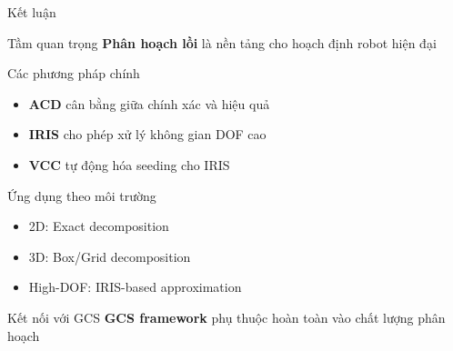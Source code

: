 \documentclass[aspectratio=169]{beamer}
\begin{document}
\begin{frame}{Kết luận}

    \begin{block}{Tầm quan trọng}
        \textbf{Phân hoạch lồi} là nền tảng cho hoạch định robot hiện đại
    \end{block}

    \begin{exampleblock}{Các phương pháp chính}
        \begin{itemize}
            \item \textbf{ACD} cân bằng giữa chính xác và hiệu quả
            \item \textbf{IRIS} cho phép xử lý không gian DOF cao
            \item \textbf{VCC} tự động hóa seeding cho IRIS
        \end{itemize}
    \end{exampleblock}

    \begin{alertblock}{Ứng dụng theo môi trường}
        \begin{itemize}
            \item 2D: Exact decomposition
            \item 3D: Box/Grid decomposition
            \item High-DOF: IRIS-based approximation
        \end{itemize}
    \end{alertblock}

    \begin{block}{Kết nối với GCS}
        \textbf{GCS framework} phụ thuộc hoàn toàn vào chất lượng phân hoạch
    \end{block}

\end{frame}
\end{document}
